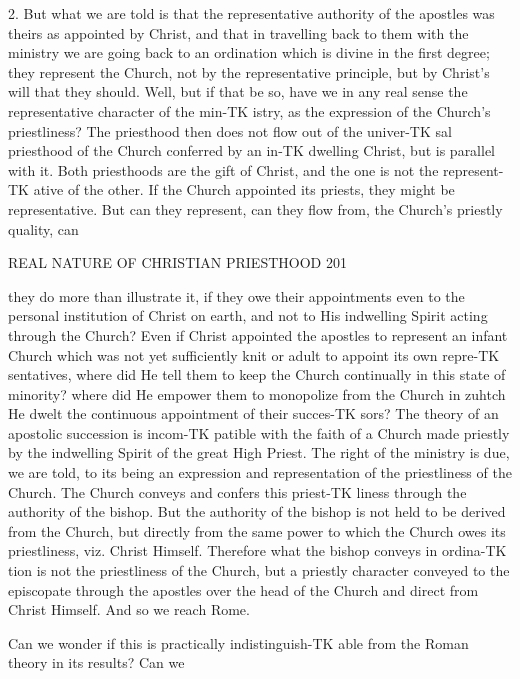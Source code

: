 \documentclass[12pt,a5paper,twoside]{book}
\begin{document}
{{2. But what we are told is that the representative 
authority of the apostles was theirs as appointed by 
Christ, and that in travelling back to them with the 
ministry we are going back to an ordination which is 
divine in the first degree; they represent the Church, 
not by the representative principle, but by Christ's will 
that they should. Well, but if that be so, have we in 
any real sense the representative character of the min-TK
istry, as the expression of the Church's priestliness? 
The priesthood then does not flow out of the univer-TK
sal priesthood of the Church conferred by an in-TK
dwelling Christ, but is parallel with it. Both priesthoods 
are the gift of Christ, and the one is not the represent-TK
ative of the other. If the Church appointed its priests, 
they might be representative. But can they represent, 
can they flow from, the Church's priestly quality, can 



REAL NATURE OF CHRISTIAN PRIESTHOOD 201 

they do more than illustrate it, if they owe their 
appointments even to the personal institution of Christ 
on earth, and not to His indwelling Spirit acting 
through the Church? Even if Christ appointed the 
apostles to represent an infant Church which was not 
yet sufficiently knit or adult to appoint its own repre-TK
sentatives, where did He tell them to keep the Church 
continually in this state of minority? where did He 
empower them to monopolize from the Church in zuhtch 
He dwelt the continuous appointment of their succes-TK
sors? The theory of an apostolic succession is incom-TK
patible with the faith of a Church made priestly by the 
indwelling Spirit of the great High Priest. The right 
of the ministry is due, we are told, to its being an 
expression and representation of the priestliness of the 
Church. The Church conveys and confers this priest-TK
liness through the authority of the bishop. But the 
authority of the bishop is not held to be derived from 
the Church, but directly from the same power to 
which the Church owes its priestliness, viz. Christ 
Himself. Therefore what the bishop conveys in ordina-TK
tion is not the priestliness of the Church, but a priestly 
character conveyed to the episcopate through the 
apostles over the head of the Church and direct from 
Christ Himself. And so we reach Rome. 

Can we wonder if this is practically indistinguish-TK
able from the Roman theory in its results? Can we 



}}
\end{document}
